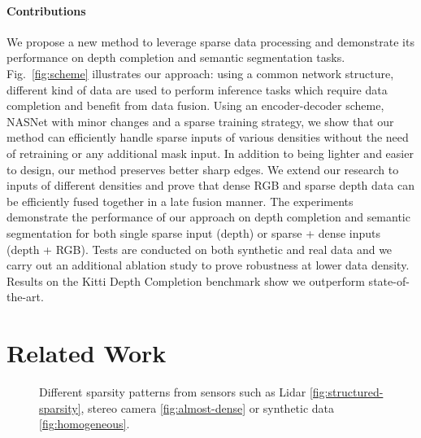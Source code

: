 \documentclass[10pt,twocolumn,letterpaper]{article}
\begin{document}
\paragraph{Contributions}
We propose a new method to leverage sparse data processing and demonstrate its performance on depth completion and semantic segmentation tasks. Fig.~\ref{fig:scheme} illustrates
our approach: using a common network structure, different kind of data are used to perform inference tasks which require data completion and benefit from data fusion.
Using an encoder-decoder scheme, NASNet \cite{zoph2017learning} with minor changes and a sparse training strategy, we show that our method can efficiently handle sparse inputs of various densities without the need of retraining or any additional mask input. In addition to being lighter and easier to design, our method preserves better sharp edges.
We extend our research to inputs of different densities and prove that dense RGB and sparse depth data can be efficiently fused together in a late fusion manner.
The experiments demonstrate the performance of our approach on depth completion and semantic segmentation for both single sparse input (depth) or sparse + dense inputs (depth + RGB).
Tests are conducted on both synthetic and real data and we carry out an additional ablation study to prove robustness at lower data density. Results on the Kitti Depth Completion benchmark show we outperform state-of-the-art.


\section{Related Work}

\begin{figure}
	\centering
	\hspace{0.01\columnwidth}
	\hspace{0.01\columnwidth}
	\caption{Different sparsity patterns from sensors such as Lidar \ref{fig:structured-sparsity}, stereo camera \ref{fig:almost-dense} or synthetic data \ref{fig:homogeneous}.}
	\label{fig:sparseDepthExamples}
\end{figure}
\end{document}
